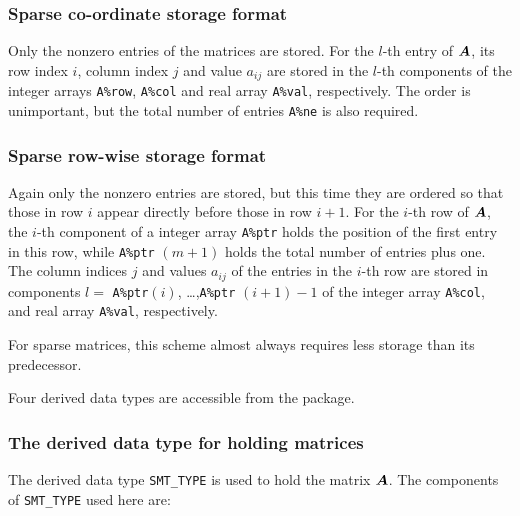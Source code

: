 \documentclass{galahad}
\begin{document}
\subsubsection{Sparse co-ordinate storage format}\label{coordinate}
Only the nonzero entries of the matrices are stored. For the 
$l$-th entry of ${\bm{A}}$, its row index $i$, column index $j$ 
and value $a_{ij}$
are stored in the $l$-th components of the integer arrays {\tt A\%row}, 
{\tt A\%col} and real array {\tt A\%val}, respectively.
The order is unimportant, but the total
number of entries {\tt A\%ne} is also required. 

\subsubsection{Sparse row-wise storage format}\label{rowwise}
Again only the nonzero entries are stored, but this time
they are ordered so that those in row $i$ appear directly before those
in row $i+1$. For the $i$-th row of ${\bm{A}}$, the $i$-th component of a 
integer array {\tt A\%ptr} holds the position of the first entry in this row,
while {\tt A\%ptr} $(m+1)$ holds the total number of entries plus one.
The column indices $j$ and values $a_{ij}$ of the entries in the $i$-th row 
are stored in components 
$l =$ {\tt A\%ptr}$(i)$, \ldots ,{\tt A\%ptr} $(i+1)-1$ of the 
integer array {\tt A\%col}, and real array {\tt A\%val}, respectively. 

For sparse matrices, this scheme almost always requires less storage than 
its predecessor.





%


\galtypes
Four derived data types are accessible from the package.


\subsubsection{The derived data type for holding matrices}\label{typesmt}
The derived data type {\tt SMT\_TYPE} is used to hold the matrix ${\bm{A}}$.
The components of {\tt SMT\_TYPE} used here are:
\end{document}
